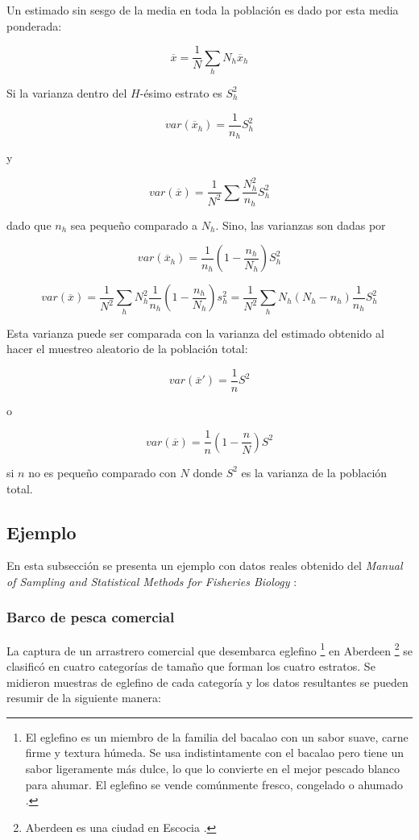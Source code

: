\documentclass{report}
\begin{document}
Un estimado sin sesgo de la media en toda la población es dado por esta media ponderada:

$$
\overline{x} = \frac{1}{N} \sum \limits_{h} N_h \overline{x}_h
$$

Si la varianza dentro del $H$-ésimo estrato es $S_h^2$

$$
var(\overline{x}_h) = \frac{1}{n_h} S_h^2
$$

y

$$
var(\overline{x}) = \frac{1}{N^2} \sum \frac{N_h^2}{n_h}S_h^2
$$

dado que $n_h$ sea pequeño comparado a $N_h$. Sino, las varianzas son dadas por

$$
var(\overline{x}_h) = \frac{1}{n_h}(1 - \frac{n_h}{N_h})S_h^2
$$


$$
var(\overline{x}) = \frac{1}{N^2} \sum \limits_h N_h^2 \frac{1}{n_h}(1 - \frac{n_h}{N_h})s_h^2 = \frac{1}{N^2} \sum \limits_h N_h (N_h - n_h) \frac{1}{n_h} S_h^2
$$

Esta varianza puede ser comparada con la varianza del estimado obtenido al hacer el muestreo aleatorio de la población total:

$$
var(\overline{x}') = \frac{1}{n}S^2
$$

o

$$
var(\overline{x}) = \frac{1}{n}(1 - \frac{n}{N})S^2
$$

si $n$ no es pequeño comparado con $N$ donde $S^2$ es la varianza de la población total.

\subsection{Ejemplo}

En esta subsección se presenta un ejemplo con datos reales obtenido del \textit{Manual of Sampling and Statistical Methods for Fisheries Biology} \cite{gulland-1966}:

\bigbreak

\subsubsection{Barco de pesca comercial}

La captura de un arrastrero comercial que desembarca eglefino \footnote{El eglefino es un miembro de la familia del bacalao con un sabor suave, carne firme y textura húmeda. Se usa indistintamente con el bacalao pero tiene un sabor ligeramente más dulce, lo que lo convierte en el mejor pescado blanco para ahumar. El eglefino se vende comúnmente fresco, congelado o ahumado \cite{sustainable-fishing-msc-marine-stewardship-council-2021}.} en Aberdeen \footnote{Aberdeen es una ciudad en Escocia \cite{wikipedia-aberdeen-2021}.} se clasificó en cuatro categorías de tamaño que forman los cuatro estratos. Se midieron muestras de eglefino de cada categoría y los datos resultantes se pueden resumir de la siguiente manera:
\end{document}
